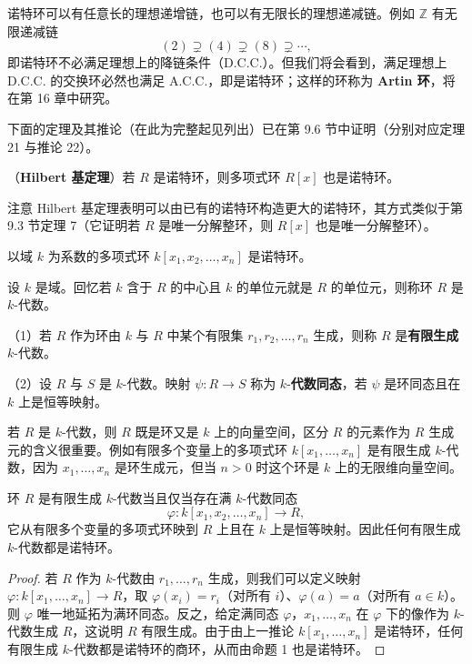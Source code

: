 诺特环可以有任意长的理想递增链，也可以有无限长的理想递减链。例如 \(\mathbb{Z}\) 有无限递减链
\[
(2) \supsetneq (4) \supsetneq (8) \supsetneq \cdots,
\]
即诺特环不必满足理想上的降链条件（D.C.C.）。但我们将会看到，满足理想上 D.C.C. 的交换环必然也满足 A.C.C.，即是诺特环；这样的环称为 \textbf{Artin 环}，将在第 16 章中研究。

下面的定理及其推论（在此为完整起见列出）已在第 9.6 节中证明（分别对应定理 21 与推论 22）。

\begin{theorem}\label{thm:15.3}
（\textbf{Hilbert 基定理}）若 \(R\) 是诺特环，则多项式环 \(R[x]\) 也是诺特环。
\end{theorem}

注意 Hilbert 基定理表明可以由已有的诺特环构造更大的诺特环，其方式类似于第 9.3 节定理 7（它证明若 \(R\) 是唯一分解整环，则 \(R[x]\) 也是唯一分解整环）。

\begin{corollary}\label{cor:15.4}
以域 \(k\) 为系数的多项式环 \(k[x_1, x_2, \ldots, x_n]\) 是诺特环。
\end{corollary}

设 \(k\) 是域。回忆若 \(k\) 含于 \(R\) 的中心且 \(k\) 的单位元就是 \(R\) 的单位元，则称环 \(R\) 是 \(k\)-代数。

\begin{definition}
（1）若 \(R\) 作为环由 \(k\) 与 \(R\) 中某个有限集 \(r_1, r_2, \ldots, r_n\) 生成，则称 \(R\) 是\textbf{有限生成} \(k\)-代数。

（2）设 \(R\) 与 \(S\) 是 \(k\)-代数。映射 \(\psi : R \to S\) 称为 \(k\)-\textbf{代数同态}，若 \(\psi\) 是环同态且在 \(k\) 上是恒等映射。
\end{definition}

若 \(R\) 是 \(k\)-代数，则 \(R\) 既是环又是 \(k\) 上的向量空间，区分 \(R\) 的元素作为 \(R\) 生成元的含义很重要。例如有限多个变量上的多项式环 \(k[x_1, \ldots, x_n]\) 是有限生成 \(k\)-代数，因为 \(x_1, \ldots, x_n\) 是环生成元，但当 \(n > 0\) 时这个环是 \(k\) 上的无限维向量空间。

\begin{corollary}\label{cor:15.5}
环 \(R\) 是有限生成 \(k\)-代数当且仅当存在满 \(k\)-代数同态
\[
\varphi : k[x_1, x_2, \ldots, x_n] \to R,
\]
它从有限多个变量的多项式环映到 \(R\) 上且在 \(k\) 上是恒等映射。因此任何有限生成 \(k\)-代数都是诺特环。
\end{corollary}

\begin{proof}
若 \(R\) 作为 \(k\)-代数由 \(r_1, \ldots, r_n\) 生成，则我们可以定义映射 \(\varphi : k[x_1, \ldots, x_n] \to R\)，取 \(\varphi(x_i) = r_i\)（对所有 \(i\)）、\(\varphi(a) = a\)（对所有 \(a \in k\)）。则 \(\varphi\) 唯一地延拓为满环同态。反之，给定满同态 \(\varphi\)，\(x_1, \ldots, x_n\) 在 \(\varphi\) 下的像作为 \(k\)-代数生成 \(R\)，这说明 \(R\) 有限生成。由于由上一推论 \(k[x_1, \ldots, x_n]\) 是诺特环，任何有限生成 \(k\)-代数都是诺特环的商环，从而由命题 1 也是诺特环。
\end{proof}

